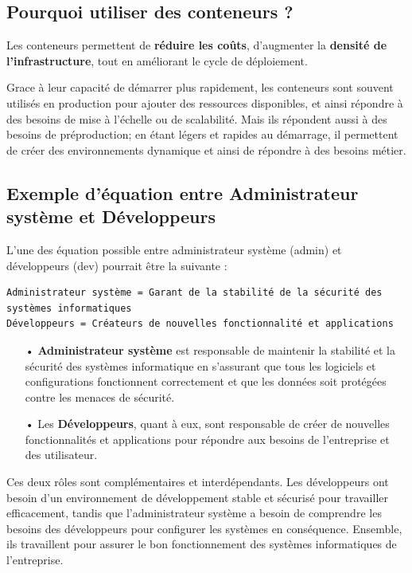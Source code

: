 \documentclass[12pt,a4paper]{article}
\begin{document}
\subsection{Pourquoi utiliser des conteneurs ?}
Les conteneurs permettent de \textbf{réduire les coûts}, d'augmenter la \textbf{densité de l'infrastructure}, tout en améliorant le cycle de déploiement.

Grace à leur capacité de démarrer plus rapidement, les conteneurs sont souvent utilisés en 
production pour ajouter des ressources disponibles, et ainsi répondre à des besoins de mise
à l'échelle ou de scalabilité. Mais ils répondent aussi à des besoins de préproduction;
en étant légers et rapides au démarrage, il permettent de créer des environnements dynamique et ainsi de répondre à des besoins métier.

\subsection{Exemple d'équation entre Administrateur système et Développeurs}
L'une des équation possible entre administrateur système (admin) et développeurs (dev)
pourrait être la suivante :
\begin{verbatim}
Administrateur système = Garant de la stabilité de la sécurité des systèmes informatiques
Développeurs = Créateurs de nouvelles fonctionnalité et applications
\end{verbatim}
\begin{itemize}
\item[•] \textbf{Administrateur système} est responsable de maintenir la stabilité et la
sécurité des systèmes informatique en s'assurant que tous les logiciels et configurations 
fonctionnent correctement et que les données soit protégées contre les menaces de sécurité.
\item[•] Les \textbf{Développeurs}, quant à eux, sont responsable de créer de nouvelles 
fonctionnalités et applications pour répondre aux besoins de l'entreprise et des 
utilisateur.
\end{itemize}

Ces deux rôles sont complémentaires et interdépendants. Les développeurs ont besoin d'un environnement de développement stable et sécurisé pour travailler efficacement, tandis que l'administrateur système a besoin de comprendre les besoins des développeurs pour configurer les systèmes en conséquence. Ensemble, ils travaillent pour assurer le bon fonctionnement des systèmes informatiques de l'entreprise.
\end{document}
